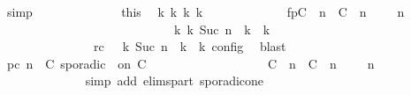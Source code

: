 \begin{isabellebody}
\ simp\isanewline
\isanewline
\ \ \ \ \ \ \ \ \ \ \ \ \isamarkupfalse%
\ this\ \isamarkupfalse%
\ {\isasymGamma}\isactrlsub k\ {\isasymPsi}\isactrlsub k\ {\isasymPhi}\isactrlsub k\ k\isanewline
\ \ \ \ \ \ \ \ \ \ \ \ \ fp{\isacharcolon}{\isacartoucheopen}{\isacharparenleft}{\isacharparenleft}{\isacharparenleft}{\isacharparenleft}C\ {\isasymUp}\ n{\isacharparenright}\ {\isacharhash}\ {\isacharparenleft}C\ {\isasymDown}\ n\ {\isacharat}\ {\isasymtau}{\isacharparenright}\ {\isacharhash}\ {\isasymGamma}{\isacharparenright}{\isacharcomma}\ n\ {\isasymturnstile}\ {\isasymPsi}\ {\isasymtriangleright}\ {\isasymPhi}{\isacharparenright}\isanewline
\ \ \ \ \ \ \ \ \ \ \ \ \ \ \ \ \ \ \ \ \ \ \ \ \ \ \ \ {\isasymhookrightarrow}\isactrlbsup k\isactrlesup \ {\isacharparenleft}{\isasymGamma}\isactrlsub k{\isacharcomma}\ Suc\ n\ {\isasymturnstile}\ {\isasymPsi}\isactrlsub k\ {\isasymtriangleright}\ {\isasymPhi}\isactrlsub k{\isacharparenright}{\isacharparenright}{\isacartoucheclose}\isanewline
\ \ \ \ \ \ \ \ \ \ \ \ \ \ \ rc{\isacharcolon}{\isacartoucheopen}{\isasymrho}\ {\isasymin}\ {\isasymlbrakk}\ {\isasymGamma}\isactrlsub k{\isacharcomma}\ Suc\ n\ {\isasymturnstile}\ {\isasymPsi}\isactrlsub k\ {\isasymtriangleright}\ {\isasymPhi}\isactrlsub k\ {\isasymrbrakk}\isactrlsub c\isactrlsub o\isactrlsub n\isactrlsub f\isactrlsub i\isactrlsub g{\isacartoucheclose}\ \isamarkupfalse%
\ blast\isanewline
\ \ \ \ \ \ \ \ \ \ \ \ \isamarkupfalse%
\ pc{\isacharcolon}{\isacartoucheopen}{\isacharparenleft}{\isasymGamma}{\isacharcomma}\ n\ {\isasymturnstile}\ {\isacharparenleft}{\isacharparenleft}C\ sporadic\ {\isasymtau}\ on\ C\ {\isacharhash}\ {\isasymPsi}{\isacharparenright}\ {\isasymtriangleright}\ {\isasymPhi}{\isacharparenright}\isanewline
\ \ \ \ \ \ \ \ \ \ \ \ \ \ {\isasymhookrightarrow}\ {\isacharparenleft}{\isacharparenleft}{\isacharparenleft}C\ {\isasymUp}\ n{\isacharparenright}\ {\isacharhash}\ {\isacharparenleft}C\ {\isasymDown}\ n\ {\isacharat}\ {\isasymtau}{\isacharparenright}\ {\isacharhash}\ {\isasymGamma}{\isacharparenright}{\isacharcomma}\ n\ {\isasymturnstile}\ {\isasymPsi}\ {\isasymtriangleright}\ {\isasymPhi}{\isacharparenright}{\isacartoucheclose}\isanewline
\ \ \ \ \ \ \ \ \ \ \ \ \isamarkupfalse%
\ {\isacharparenleft}simp\ add{\isacharcolon}\ elims{\isacharunderscore}part\ sporadic{\isacharunderscore}on{\isacharunderscore}e{}{\isacharparenright}\isanewline

\end{isabellebody}
